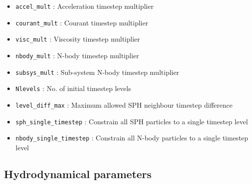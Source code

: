 \documentclass[a4paper]{article}
\newcommand{\var}[1]{\texttt{#1}}
\begin{document}
\begin{itemize}

\item \var{accel\_mult} : Acceleration timestep multiplier

\item \var{courant\_mult} : Courant timestep multiplier

\item \var{visc\_mult} : Viscosity timestep multiplier

\item \var{nbody\_mult} : N-body timestep multiplier

\item \var{subsys\_mult} : Sub-system N-body timestep multiplier

\item \var{Nlevels} : No. of initial timestep levels

\item \var{level\_diff\_max} : Maximum allowed SPH neighbour timestep difference

\item \var{sph\_single\_timestep} : Constrain all SPH particles to a single timestep level

\item \var{nbody\_single\_timestep} : Constrain all N-body particles to a single timestep level


\end{itemize}




\subsection{Hydrodynamical parameters}
\end{document}

